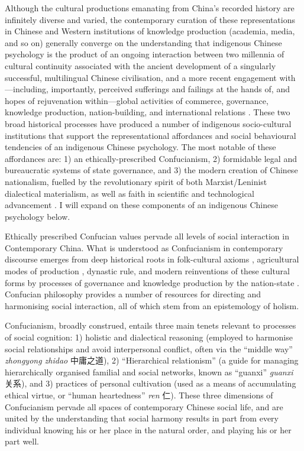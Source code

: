 \begin{CJK}{UTF8}{gbsn}
Although the cultural productions emanating from China's recorded history are infinitely diverse and varied, the contemporary curation of these representations in Chinese and Western institutions of knowledge production (academia, media, and so on) generally converge on the understanding that indigenous Chinese psychology is the product of an ongoing interaction between two millennia of cultural continuity associated with the ancient development of a singularly successful, multilingual Chinese civilisation, and a more recent engagement with---including, importantly, perceived sufferings and failings at the hands of, and hopes of rejuvenation within---global activities of commerce, governance, knowledge production, nation-building, and international relations \citep{Liu2009}.  These two broad historical processes have produced a number of indigenous socio-cultural institutions that support the representational affordances and social behavioural tendencies of an indigenous Chinese psychology.  The most notable of these affordances are: 1) an ethically-prescribed Confucianism, 2) formidable legal and bureaucratic systems of state governance, and 3) the modern creation of Chinese nationalism, fuelled by the revolutionary spirit of both Marxist/Leninist dialectical materialism, as well as faith in scientific and technological advancement \citep{Barme2009}.  I will expand on these components of an indigenous Chinese psychology below.

Ethically prescribed Confucian values pervade all levels of social interaction in Contemporary China. What is understood as Confucianism in contemporary discourse emerges from deep historical roots in folk-cultural axioms \citep{Wang2009}, agricultural modes of production \citep{Talhelm2014,Fei1992}, dynastic rule, and modern reinventions of these cultural forms by processes of governance and knowledge production by the nation-state \citep{Hwang1999,Liu2014}.  Confucian philosophy provides a number of resources for directing and harmonising social interaction, all of which stem from an epistemology of holism.

Confucianism, broadly construed, entails three main tenets relevant to processes of social cognition: 1) holistic and dialectical reasoning (employed to harmonise social relationships and avoid interpersonal conflict, often via the ``middle way'' \textit{zhongyong zhidao} 中庸之道), 2) ``Hierarchical relationism'' (a guide for managing hierarchically organised familial and social networks, known as ``guanxi'' \textit{guanxi} 关系), and 3) practices of personal cultivation (used as a means of accumulating ethical virtue, or ``human heartedness'' \textit{ren} 仁).  These three dimensions of Confucianism pervade all spaces of contemporary Chinese social life, and are united by the understanding that social harmony results in part from every individual knowing his or her place in the natural order, and playing his or her part well.


\end{CJK}
